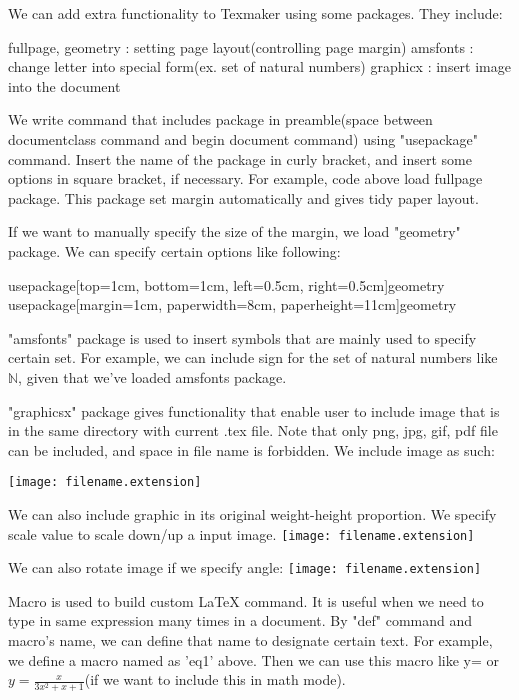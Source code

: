 \documentclass[11pt]{article}
\def\eq1{y=\frac{x}{3x^2+x+1}}
\begin{document}
We can add extra functionality to Texmaker using some packages. They include:

\begin{itemize}
fullpage, geometry : setting page layout(controlling page margin)
amsfonts : change letter into special form(ex. set of natural numbers)
graphicx : insert image into the document
\end{itemize}

We write command that includes package in preamble(space between documentclass command
and begin document command) using "usepackage" command. Insert the name of the package
in curly bracket, and insert some options in square bracket, if necessary. For example,
code above load fullpage package. This package set margin automatically and gives tidy 
paper layout. 

If we want to manually specify the size of the margin, we load "geometry" package. We 
can specify certain options like following:

usepackage[top=1cm, bottom=1cm, left=0.5cm, right=0.5cm]{geometry}\\
usepackage[margin=1cm, paperwidth=8cm, paperheight=11cm]{geometry}

"amsfonts" package is used to insert symbols that are mainly used to specify certain set.
For example, we can include sign for the set of natural numbers like $\mathbb{N}$, given
that we've loaded amsfonts package.

"graphicsx" package gives functionality that enable user to include image that is in
the same directory with current .tex file. Note that only png, jpg, gif, pdf file can
be included, and space in file name is forbidden. We include image as such:
\begin{center}
\texttt{[image: filename.extension]}
\end{center}

We can also include graphic in its original weight-height proportion. We specify scale
value to scale down/up a input image.
\texttt{[image: filename.extension]}

We can also rotate image if we specify angle:
\texttt{[image: filename.extension]}

Macro is used to build custom LaTeX command. It is useful when we need to type in same
expression many times in a document. By "def" command and macro's name, we can define 
that name to designate certain text. For example, we define a macro named as 'eq1' above.
Then we can use this macro like \eq1 or $\eq1$(if we want to include this in math mode).
\end{document}
